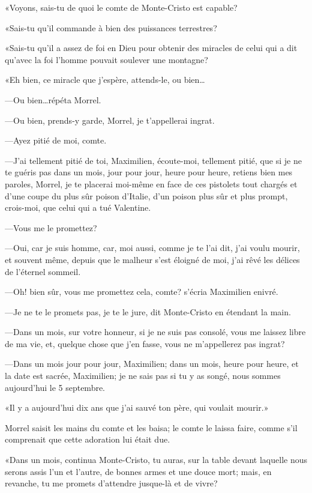 «Voyons, sais-tu de quoi le comte de Monte-Cristo est capable? 

«Sais-tu qu'il commande à bien des puissances terrestres? 

«Sais-tu qu'il a assez de foi en Dieu pour obtenir des miracles de celui qui a dit qu'avec la foi l'homme pouvait soulever une montagne? 

«Eh bien, ce miracle que j'espère, attends-le, ou bien\dots 

—Ou bien\dots répéta Morrel. 

—Ou bien, prends-y garde, Morrel, je t'appellerai ingrat. 

—Ayez pitié de moi, comte. 

—J'ai tellement pitié de toi, Maximilien, écoute-moi, tellement pitié, que si je ne te guéris pas dans un mois, jour pour jour, heure pour heure, retiens bien mes paroles, Morrel, je te placerai moi-même en face de ces pistolets tout chargés et d'une coupe du plus sûr poison d'Italie, d'un poison plus sûr et plus prompt, crois-moi, que celui qui a tué Valentine. 

—Vous me le promettez? 

—Oui, car je suis homme, car, moi aussi, comme je te l'ai dit, j'ai voulu mourir, et souvent même, depuis que le malheur s'est éloigné de moi, j'ai rêvé les délices de l'éternel sommeil. 

—Oh! bien sûr, vous me promettez cela, comte? s'écria Maximilien enivré. 

—Je ne te le promets pas, je te le jure, dit Monte-Cristo en étendant la main. 

—Dans un mois, sur votre honneur, si je ne suis pas consolé, vous me laissez libre de ma vie, et, quelque chose que j'en fasse, vous ne m'appellerez pas ingrat? 

—Dans un mois jour pour jour, Maximilien; dans un mois, heure pour heure, et la date est sacrée, Maximilien; je ne sais pas si tu y as songé, nous sommes aujourd'hui le 5 septembre. 

«Il y a aujourd'hui dix ans que j'ai sauvé ton père, qui voulait mourir.» 

Morrel saisit les mains du comte et les baisa; le comte le laissa faire, comme s'il comprenait que cette adoration lui était due. 

«Dans un mois, continua Monte-Cristo, tu auras, sur la table devant laquelle nous serons assis l'un et l'autre, de bonnes armes et une douce mort; mais, en revanche, tu me promets d'attendre jusque-là et de vivre? 


